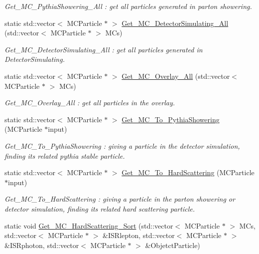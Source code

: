 \begin{DoxyCompactItemize}
\begin{DoxyCompactList}\small\item\em Get\_\-MC\_\-PythiaShowering\_\-All : get all particles generated in parton showering. \item\end{DoxyCompactList}\item 
static std::vector$<$ MCParticle $\ast$ $>$ \hyperlink{classToolSet_1_1CMC_a8581240b2a8d474e851c3c1ed256fada}{Get\_\-MC\_\-DetectorSimulating\_\-All} (std::vector$<$ MCParticle $\ast$ $>$ MCs)
\begin{DoxyCompactList}\small\item\em Get\_\-MC\_\-DetectorSimulating\_\-All : get all particles generated in DetectorSimulating. \item\end{DoxyCompactList}\item 
static std::vector$<$ MCParticle $\ast$ $>$ \hyperlink{classToolSet_1_1CMC_a4bf55a4d64eeec4762f87ee7de91f585}{Get\_\-MC\_\-Overlay\_\-All} (std::vector$<$ MCParticle $\ast$ $>$ MCs)
\begin{DoxyCompactList}\small\item\em Get\_\-MC\_\-Overlay\_\-All : get all particles in the overlay. \item\end{DoxyCompactList}\item 
static std::vector$<$ MCParticle $\ast$ $>$ \hyperlink{classToolSet_1_1CMC_a90ef4f7069e375c606a3469d13ed3109}{Get\_\-MC\_\-To\_\-PythiaShowering} (MCParticle $\ast$input)
\begin{DoxyCompactList}\small\item\em Get\_\-MC\_\-To\_\-PythiaShowering : giving a particle in the detector simulation, finding its related pythia stable particle. \item\end{DoxyCompactList}\item 
static std::vector$<$ MCParticle $\ast$ $>$ \hyperlink{classToolSet_1_1CMC_a756210f61bb929e423d1372989ad0358}{Get\_\-MC\_\-To\_\-HardScattering} (MCParticle $\ast$input)
\begin{DoxyCompactList}\small\item\em Get\_\-MC\_\-To\_\-HardScattering : giving a particle in the parton showering or detector simulation, finding its related hard scattering particle. \item\end{DoxyCompactList}\item 
static void \hyperlink{classToolSet_1_1CMC_abf41aa5efde937a3e21fa3b24323d570}{Get\_\-MC\_\-HardScattering\_\-Sort} (std::vector$<$ MCParticle $\ast$ $>$ MCs, std::vector$<$ MCParticle $\ast$ $>$ \&ISRlepton, std::vector$<$ MCParticle $\ast$ $>$ \&ISRphoton, std::vector$<$ MCParticle $\ast$ $>$ \&ObjetctParticle)

\end{DoxyCompactItemize}
